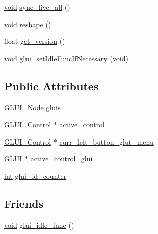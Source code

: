\begin{DoxyCompactItemize}
\item 
\hyperlink{wglext_8h_a9e6b7f1933461ef318bb000d6bd13b83}{void} \hyperlink{class_g_l_u_i___master___object_a6fb29a6080a45d364fc4653591cb1ade}{sync\+\_\+live\+\_\+all} ()
\item 
\hyperlink{wglext_8h_a9e6b7f1933461ef318bb000d6bd13b83}{void} \hyperlink{class_g_l_u_i___master___object_a8e092dea6e4ae3a6b52c8cba92eeefb4}{reshape} ()
\item 
float \hyperlink{class_g_l_u_i___master___object_ad4654282669300f569d30a4c430f4e6f}{get\+\_\+version} ()
\item 
\hyperlink{wglext_8h_a9e6b7f1933461ef318bb000d6bd13b83}{void} \hyperlink{class_g_l_u_i___master___object_af9b11cec3c215c6acc1de9bf8e0d92f3}{glui\+\_\+set\+Idle\+Func\+If\+Necessary} (\hyperlink{wglext_8h_a9e6b7f1933461ef318bb000d6bd13b83}{void})
\end{DoxyCompactItemize}
\subsection*{Public Attributes}
\begin{DoxyCompactItemize}
\item 
\hyperlink{class_g_l_u_i___node}{G\+L\+U\+I\+\_\+\+Node} \hyperlink{class_g_l_u_i___master___object_adef972538b4195478dd9feaabd55bd26}{gluis}
\item 
\hyperlink{class_g_l_u_i___control}{G\+L\+U\+I\+\_\+\+Control} $\ast$ \hyperlink{class_g_l_u_i___master___object_a024c89d0bbae3ea4ebf84af79b093a36}{active\+\_\+control}
\item 
\hyperlink{class_g_l_u_i___control}{G\+L\+U\+I\+\_\+\+Control} $\ast$ \hyperlink{class_g_l_u_i___master___object_a0df5b34fced5bb930fb0fe4d982b4e8c}{curr\+\_\+left\+\_\+button\+\_\+glut\+\_\+menu}
\item 
\hyperlink{class_g_l_u_i}{G\+L\+U\+I} $\ast$ \hyperlink{class_g_l_u_i___master___object_a41b447c76e0a9088aa703593499ff4cb}{active\+\_\+control\+\_\+glui}
\item 
\hyperlink{wglext_8h_a500a82aecba06f4550f6849b8099ca21}{int} \hyperlink{class_g_l_u_i___master___object_a9cd3c12203f03cd54115e7852e0d82e3}{glui\+\_\+id\+\_\+counter}
\end{DoxyCompactItemize}
\subsection*{Friends}
\begin{DoxyCompactItemize}
\item 
\hyperlink{wglext_8h_a9e6b7f1933461ef318bb000d6bd13b83}{void} \hyperlink{class_g_l_u_i___master___object_ad7c67b26e8436e7ef84d8657704010da}{glui\+\_\+idle\+\_\+func} ()
\end{DoxyCompactItemize}


